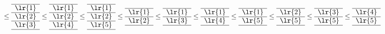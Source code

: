 \[
\le
\begin{array}[c]{*{1}c}\cline{1-1}
\lr{1}\\\cline{1-1}
\lr{2}\\\cline{1-1}
\lr{3}\\\cline{1-1}
\end{array}
\le
\begin{array}[c]{*{1}c}\cline{1-1}
\lr{1}\\\cline{1-1}
\lr{2}\\\cline{1-1}
\lr{4}\\\cline{1-1}
\end{array}
\le
\begin{array}[c]{*{1}c}\cline{1-1}
\lr{1}\\\cline{1-1}
\lr{2}\\\cline{1-1}
\lr{5}\\\cline{1-1}
\end{array}
\le
\begin{array}[c]{*{1}c}\cline{1-1}
\lr{1}\\\cline{1-1}
\lr{2}\\\cline{1-1}
\end{array}
\le
\begin{array}[c]{*{1}c}\cline{1-1}
\lr{1}\\\cline{1-1}
\lr{3}\\\cline{1-1}
\end{array}
\le
\begin{array}[c]{*{1}c}\cline{1-1}
\lr{1}\\\cline{1-1}
\lr{4}\\\cline{1-1}
\end{array}
\le
\begin{array}[c]{*{1}c}\cline{1-1}
\lr{1}\\\cline{1-1}
\lr{5}\\\cline{1-1}
\end{array}
\le
\begin{array}[c]{*{1}c}\cline{1-1}
\lr{2}\\\cline{1-1}
\lr{5}\\\cline{1-1}
\end{array}
\le
\begin{array}[c]{*{1}c}\cline{1-1}
\lr{3}\\\cline{1-1}
\lr{5}\\\cline{1-1}
\end{array}
\le
\begin{array}[c]{*{1}c}\cline{1-1}
\lr{4}\\\cline{1-1}
\lr{5}\\\cline{1-1}
\end{array}

\]